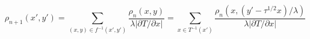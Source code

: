 \begin{equation}
\rho_{n+1}(x',y') = \sum_{(x,y)\in f^{-1}(x',y')}
          \frac{\rho_n(x,y)}{\lambda |\partial T/\partial x|}
                  = \sum_{x\in T^{-1}(x')}
          \frac{\rho_n(x,(y'-\tau^{1/2}x)/\lambda)}
               {\lambda |\partial T/\partial x|}
\label{eq8}
\end{equation}

